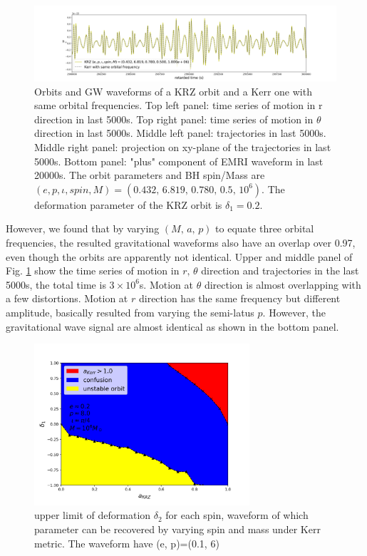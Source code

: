 \documentclass{article}
\begin{document}
\begin{figure}[!htb]
	\includegraphics[width=14cm]{wave_d102.png}
	
	\caption{Orbits and GW waveforms of a KRZ orbit and a Kerr one with same orbital frequencies. Top left panel: time series of motion in r direction in last 5000s. Top right panel: time series of motion in $\theta$ direction in last 5000s. Middle left panel: trajectories in last 5000s. Middle right panel: projection on xy-plane of the trajectories in last 5000s. Bottom panel: "plus" component of EMRI waveform in last 20000s. The orbit parameters and BH spin/Mass are $(e,p,\iota,spin,M)=(0.432,\, 6.819,\, 0.780,\, 0.5,\, 10^6)$. The deformation parameter of the KRZ orbit is $\delta_1=0.2$.}
	\label{3dtraj}
\end{figure}

However, we found that by varying $(M,\, a,\, p)$ to equate three orbital frequencies, the resulted gravitational waveforms also have an overlap over 0.97, even though the orbits are apparently not identical. Upper and middle panel of Fig. \ref{3dtraj} show the time series of motion in $r,\, \theta $ direction and trajectories in the last 5000s, the total time is $3\times 10^6$s. Motion at $\theta$ direction is almost overlapping with a few distortions. Motion at $r$ direction has the same frequency but different amplitude, basically resulted from varying the semi-latus $p$. However, the gravitational wave signal are almost identical as shown in the bottom panel. 

\begin{figure}[!htb]
	\centering
	\includegraphics[width=8cm]{3D_bound.png}
	
	\caption{upper limit of deformation $\delta_2$ for each spin, waveform of which parameter can be recovered by varying spin and mass under Kerr metric. The waveform have (e, p)=(0.1, 6)}
	\label{3dlimit}
\end{figure}
\end{document}
